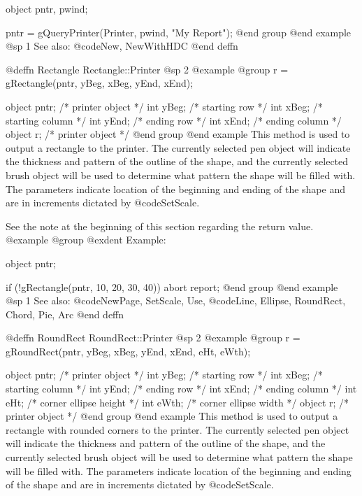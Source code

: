 object  pntr, pwind;

pntr = gQueryPrinter(Printer, pwind, "My Report");
@end group
@end example
@sp 1
See also:  @code{New, NewWithHDC}
@end deffn
















@deffn {Rectangle} Rectangle::Printer
@sp 2
@example
@group
r = gRectangle(pntr, yBeg, xBeg, yEnd, xEnd);

object  pntr;   /*  printer object   */
int     yBeg;   /*  starting row     */
int     xBeg;   /*  starting column  */
int     yEnd;   /*  ending row       */
int     xEnd;   /*  ending column    */
object  r;      /*  printer object   */
@end group
@end example
This method is used to output a rectangle to the printer.  The currently
selected pen object will indicate the thickness and pattern of the outline
of the shape, and the currently selected brush object will be used to determine
what pattern the shape will be filled with.
The parameters indicate location of the beginning and ending of the shape
and are in increments dictated by @code{SetScale}.

See the note at the beginning of this section regarding the return value.
@example
@group
@exdent Example:

object  pntr;

if (!gRectangle(pntr, 10, 20, 30, 40))
        abort report;
@end group
@end example
@sp 1
See also:  @code{NewPage, SetScale, Use,}
        @code{Line, Ellipse, RoundRect, Chord, Pie, Arc}
@end deffn















@deffn {RoundRect} RoundRect::Printer
@sp 2
@example
@group
r = gRoundRect(pntr, yBeg, xBeg, yEnd, xEnd, eHt, eWth);

object  pntr;   /*  printer object         */
int     yBeg;   /*  starting row           */
int     xBeg;   /*  starting column        */
int     yEnd;   /*  ending row             */
int     xEnd;   /*  ending column          */
int     eHt;    /*  corner ellipse height  */
int     eWth;   /*  corner ellipse width   */
object  r;      /*  printer object         */
@end group
@end example
This method is used to output a rectangle with rounded corners to the
printer.  The currently selected pen object will indicate the thickness
and pattern of the outline of the shape, and the currently selected
brush object will be used to determine what pattern the shape will be
filled with.  The parameters indicate location of the beginning and
ending of the shape and are in increments dictated by @code{SetScale}.

